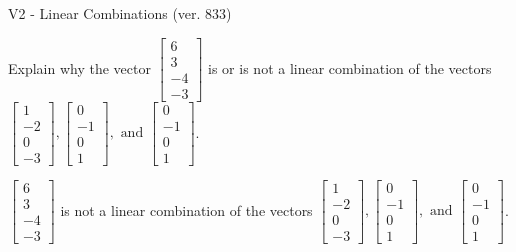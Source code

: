 \begin{exercise}
  \begin{exerciseTitle}V2 - Linear Combinations (ver. 833)\end{exerciseTitle}
  \begin{exerciseStatement}
    Explain why the vector \(\left[\begin{array}{c}
6 \\
3 \\
-4 \\
-3
\end{array}\right]\)  is or is not a linear 
	combination of the vectors \(\left[\begin{array}{c}
1 \\
-2 \\
0 \\
-3
\end{array}\right] , \left[\begin{array}{c}
0 \\
-1 \\
0 \\
1
\end{array}\right] , \text{ and } \left[\begin{array}{c}
0 \\
-1 \\
0 \\
1
\end{array}\right]\).
	


  \end{exerciseStatement}
  \begin{exerciseAnswer}
   \(\left[\begin{array}{c}
6 \\
3 \\
-4 \\
-3
\end{array}\right]\) 
  	 is not  
	a linear combination of the vectors \(\left[\begin{array}{c}
1 \\
-2 \\
0 \\
-3
\end{array}\right] , \left[\begin{array}{c}
0 \\
-1 \\
0 \\
1
\end{array}\right] , \text{ and } \left[\begin{array}{c}
0 \\
-1 \\
0 \\
1
\end{array}\right]\).

	
  


  \end{exerciseAnswer}
\end{exercise}